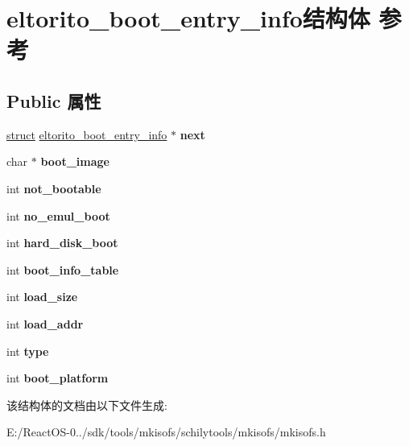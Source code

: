 \hypertarget{structeltorito__boot__entry__info}{}\section{eltorito\+\_\+boot\+\_\+entry\+\_\+info结构体 参考}
\label{structeltorito__boot__entry__info}
\subsection*{Public 属性}
\begin{DoxyCompactItemize}
\item 
\mbox{\label{structeltorito__boot__entry__info_a3ce6e90ab10631e829c99498dd36b4e6}} 
\hyperlink{interfacestruct}{struct} \hyperlink{structeltorito__boot__entry__info}{eltorito\+\_\+boot\+\_\+entry\+\_\+info} $\ast$ {\bfseries next}
\item 
\mbox{\label{structeltorito__boot__entry__info_a22c5709b88307e6cf0381ac817bd34a8}} 
char $\ast$ {\bfseries boot\+\_\+image}
\item 
\mbox{\label{structeltorito__boot__entry__info_aea9b04d5d64c8a1ee836d0c6abda0501}} 
int {\bfseries not\+\_\+bootable}
\item 
\mbox{\label{structeltorito__boot__entry__info_ac29ae3d25d85249963d3a9486a1e3818}} 
int {\bfseries no\+\_\+emul\+\_\+boot}
\item 
\mbox{\label{structeltorito__boot__entry__info_abbfe6d9a53df274b5b4413c4e44284e6}} 
int {\bfseries hard\+\_\+disk\+\_\+boot}
\item 
\mbox{\label{structeltorito__boot__entry__info_adfbe43586f52f6230e6cac16aa93cbf1}} 
int {\bfseries boot\+\_\+info\+\_\+table}
\item 
\mbox{\label{structeltorito__boot__entry__info_a6a83c99e2f5f1742202bfe4c33f9a6ea}} 
int {\bfseries load\+\_\+size}
\item 
\mbox{\label{structeltorito__boot__entry__info_adac2c0a426e309a460426c46b4266a95}} 
int {\bfseries load\+\_\+addr}
\item 
\mbox{\label{structeltorito__boot__entry__info_a16beb2184e805ca3dae6845bb01c41b3}} 
int {\bfseries type}
\item 
\mbox{\label{structeltorito__boot__entry__info_a75e9c069af80d0faa025be8cf23059df}} 
int {\bfseries boot\+\_\+platform}
\end{DoxyCompactItemize}


该结构体的文档由以下文件生成\+:\begin{DoxyCompactItemize}
\item 
E\+:/\+React\+O\+S-\/0../sdk/tools/mkisofs/schilytools/mkisofs/mkisofs.\+h\end{DoxyCompactItemize}
